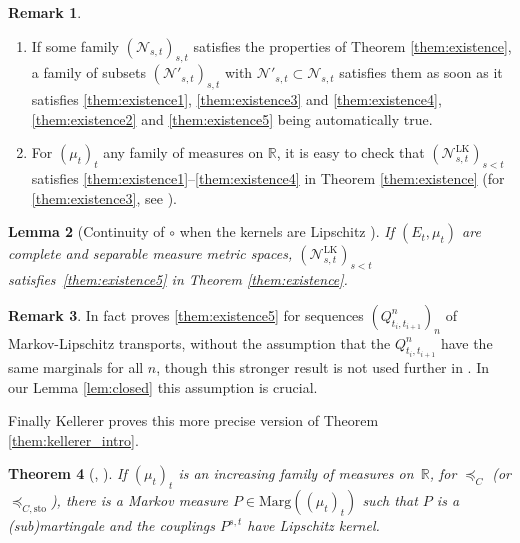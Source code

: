 \documentclass[JEP,XML,SOM,Unicode,NoEqCountersInSection,NoFloatCountersInSection,published]{cedram}
\theoremstyle{plain}
\newtheorem{them}{Theorem}[section]
\newtheorem{lem}[them]{Lemma}
\theoremstyle{definition}
\newtheorem{rem}[them]{Remark}
\newcommand{\ML}{\mathrm{LK}}
\newcommand{\ma}{\mathrm{Marg}}
\newcommand{\R}{\mathbb{R}}
\newcommand{\sto}{\mathrm{sto}}
\newcommand{\leqc}{\preceq_{C}}
\newcommand{\leqcs}{\preceq_{C,\sto}}
\begin{document}
\skpt
\begin{rem}\label{rem:otherNs}
\begin{enumerate}
\item\label{rem:otherNsa}
\label{item:rem:otherNsA} If some family $(\mathcal{N}_{s,t})_{s,t}$ satisfies the properties of Theorem \ref{them:existence}, a family of subsets $(\mathcal{N}'_{s,t})_{s,t}$ with $\mathcal{N}'_{s,t}\subset \mathcal{N}_{s,t}$ satisfies them as soon as it satisfies \eqref{them:existence1}, \eqref{them:existence3} and \eqref{them:existence4}, \eqref{them:existence2} and \eqref{them:existence5} being automatically true.

\item\label{rem:otherNsb}
\label{item:rem:otherNsB} For $(\mu_t)_t$ any family of measures on $\R$, it is easy to check that $(\mathcal{N}^\ML_{s,t})_{s<t}$ satisfies \eqref{them:existence1}--\eqref{them:existence4} in Theorem \ref{them:existence} (for \eqref{them:existence3}, see \cite[Satz 13]{Ke72}).
\end{enumerate}
\end{rem}

\begin{lem}[Continuity of $\circ$ when the kernels are Lipschitz {\cite[Sätze 14 \& 15]{Ke72}}]\label{lem:lipschtz_implique_cinq}
If $(E_t,\mu_t)$ are complete and separable measure metric spaces, $(\mathcal{N}^\ML_{s,t})_{s<t}$ satisfies~\eqref{them:existence5} in Theorem \ref{them:existence}.
\end{lem}

\begin{rem}In fact \cite[Sätze 14 \& 15]{Ke72} proves \eqref{them:existence5} for sequences $(Q_{t_i,t_{i+1}}^n)_n$ of Markov-Lipschitz transports, without the assumption that the $Q_{t_i,t_{i+1}}^n$ have the same marginals for all $n$, though this stronger result is not used further in \cite{Ke72}. In our Lemma \ref{lem:closed} this assumption is crucial.
\end{rem}

Finally Kellerer proves this more precise version of Theorem \ref{them:kellerer_intro}.

\begin{them}[{\cite[Th.\,3]{Ke72}, \cite{Ke73}}]\label{them:kellerer_final} If $(\mu_t)_t$ is an increasing family of measures on~$\R$, for $\leqc$ (or $\leqcs$), there is a Markov measure $P\in\ma((\mu_t)_t)$ such that $P$ is a (sub)martingale and the couplings $P^{s,t}$ have Lipschitz kernel.
\end{them}
\end{document}
